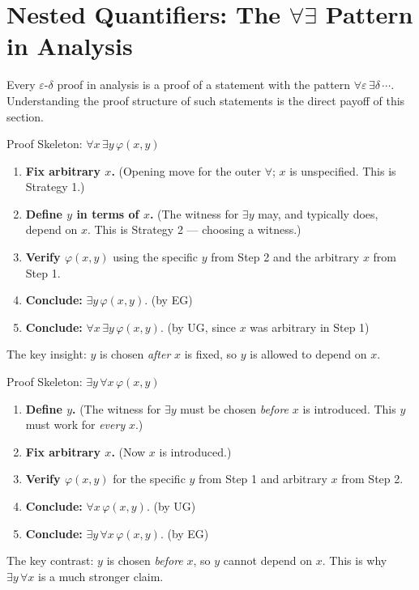 
\section*{\texorpdfstring{Nested Quantifiers: The $\forall\exists$ Pattern in Analysis}{Nested Quantifiers: The forallexists Pattern in Analysis}}

\begin{exposition}
Every $\varepsilon$-$\delta$ proof in analysis is a proof of a statement with
the pattern $\forall\varepsilon\,\exists\delta\,\cdots$. Understanding the
proof structure of such statements is the direct payoff of this section.
\end{exposition}

\begin{propositionbox}{Proof Skeleton: $\forall x\,\exists y\,\varphi(x,y)$}
\begin{enumerate}[label=\textbf{Step \arabic*.}]
\item \textbf{Fix arbitrary $x$.} \quad (Opening move for the outer $\forall$; $x$ is
  unspecified. This is Strategy 1.)
\item \textbf{Define $y$ in terms of $x$.} \quad (The witness for $\exists y$ may, and
  typically does, depend on $x$. This is Strategy 2 --- choosing a witness.)
\item \textbf{Verify $\varphi(x,y)$} \quad using the specific $y$ from Step 2 and
  the arbitrary $x$ from Step 1.
\item \textbf{Conclude:} $\exists y\,\varphi(x,y)$. \quad (by EG)
\item \textbf{Conclude:} $\forall x\,\exists y\,\varphi(x,y)$. \quad (by UG, since $x$
  was arbitrary in Step 1)
\end{enumerate}
The key insight: $y$ is chosen \emph{after} $x$ is fixed, so $y$ is allowed
to depend on $x$.
\end{propositionbox}

\begin{propositionbox}{Proof Skeleton: $\exists y\,\forall x\,\varphi(x,y)$}
\begin{enumerate}[label=\textbf{Step \arabic*.}]
\item \textbf{Define $y$.} \quad (The witness for $\exists y$ must be chosen \emph{before}
  $x$ is introduced. This $y$ must work for \emph{every} $x$.)
\item \textbf{Fix arbitrary $x$.} \quad (Now $x$ is introduced.)
\item \textbf{Verify $\varphi(x,y)$} \quad for the specific $y$ from Step 1 and
  arbitrary $x$ from Step 2.
\item \textbf{Conclude:} $\forall x\,\varphi(x,y)$. \quad (by UG)
\item \textbf{Conclude:} $\exists y\,\forall x\,\varphi(x,y)$. \quad (by EG)
\end{enumerate}
The key contrast: $y$ is chosen \emph{before} $x$, so $y$ cannot depend on
$x$. This is why $\exists y\,\forall x$ is a much stronger claim.
\end{propositionbox}

